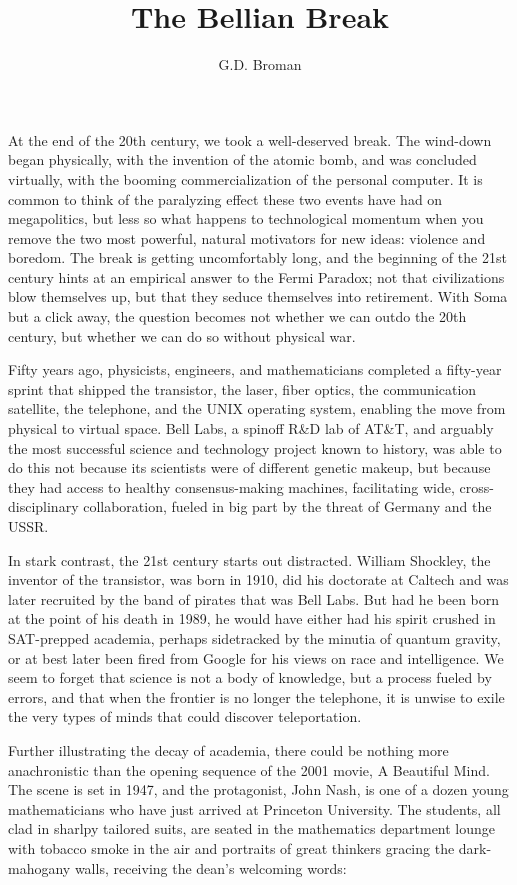 \documentclass[12pt]{article}
\title{The Bellian Break}
\author{G.D. Broman}
\date{}
\begin{document}
\maketitle

At the end of the 20th century, we took a well-deserved break. The wind-down began physically, with the invention of the atomic bomb, and was concluded virtually, with the booming commercialization of the personal computer. It is common to think of the paralyzing effect these two events have had on megapolitics, but less so what happens to technological momentum when you remove the two most powerful, natural motivators for new ideas: violence and boredom. The break is getting uncomfortably long, and the beginning of the 21st century hints at an empirical answer to the Fermi Paradox; not that civilizations blow themselves up, but that they seduce themselves into retirement. With Soma but a click away, the question becomes not whether we can outdo the 20th century, but whether we can do so without physical war.

Fifty years ago, physicists, engineers, and mathematicians completed a fifty-year sprint that shipped the transistor, the laser, fiber optics, the communication satellite, the telephone, and the UNIX operating system, enabling the move from physical to virtual space. Bell Labs, a spinoff R\&D lab of AT\&T, and arguably the most successful science and technology project known to history, was able to do this not because its scientists were of different genetic makeup, but because they had access to healthy consensus-making machines, facilitating wide, cross-disciplinary collaboration, fueled in big part by the threat of Germany and the USSR.

In stark contrast, the 21st century starts out distracted. William Shockley, the inventor of the transistor, was born in 1910, did his doctorate at Caltech and was later recruited by the band of pirates that was Bell Labs. But had he been born at the point of his death in 1989, he would have either had his spirit crushed in SAT-prepped academia, perhaps sidetracked by the minutia of quantum gravity, or at best later been fired from Google for his views on race and intelligence. We seem to forget that science is not a body of knowledge, but a process fueled by errors, and that when the frontier is no longer the telephone, it is unwise to exile the very types of minds that could discover teleportation.

Further illustrating the decay of academia, there could be nothing more anachronistic than the opening sequence of the 2001 movie, A Beautiful Mind. The scene is set in 1947, and the protagonist, John Nash, is one of a dozen young mathematicians who have just arrived at Princeton University. The students, all clad in sharlpy tailored suits, are seated in the mathematics department lounge with tobacco smoke in the air and portraits of great thinkers gracing the dark-mahogany walls, receiving the dean's welcoming words:
\end{document}
